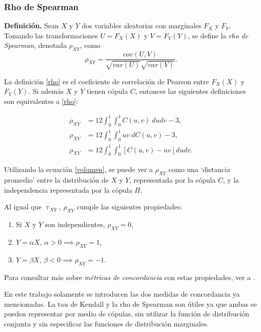 \documentclass[11pt,a4paper]{article}
\begin{document}
\newpage

\subsubsection*{Rho de Spearman}

\textbf{Definición.} Sean $X$ y $Y$ dos variables aleatorias con marginales $F_X$ y $F_Y$. Tomando las transformaciones $U = F_X(X)$ y $V = F_Y(Y)$, se define la \textit{rho de Spearman}, denotada $\rho_{XY}$, como
\begin{equation} \label{rho}
\rho_{XY} = \frac{cov(U, V)}{\sqrt{var(U)}\sqrt{var(V)}}.
\end{equation}

La definición \eqref{rho} es el coeficiente de correlación de Pearson entre $F_X(X)$ y $F_Y(Y)$. Si además $X$ y $Y$ tienen cópula $C$, entonces las siguientes definiciones son equivalentes a \eqref{rho}:

\begin{align}
\rho_{XY} &= 12\int_0^1 \int_0^1 C(u, v) \ dudv-3,\nonumber \\
\rho_{XY} &= 12\int_0^1 \int_0^1 uv \ dC(u,v)-3, \nonumber \\
\rho_{XY} &= 12\int_0^1\int_0^1 \left[ C(u, v) - uv \right] dudv \label{volumen}.
\end{align}

Utilizando la ecuación \eqref{volumen}, se puede ver a $\rho_{XY}$ como una `distancia promedio' entre la distribución de $X$ y $Y$, representada por la cópula $C$, y la independencia representada por la cópula $\Pi$.

Al igual que $\uptau_{XY}$, $\rho_{XY}$ cumple las siguientes propiedades:

\begin{enumerate}
\item Si $X$ y $Y$ son independientes, $\rho_{XY} = 0$,
\item $Y = \alpha X$, $\alpha > 0 \implies \rho_{XY} = 1$,
\item $Y = \beta X$, $\beta < 0 \implies \rho_{XY} = -1$.
\end{enumerate}

Para consultar más sobre \textit{métricas de concordancia} con estas propiedades, ver a \citet{nelsen}.

En este trabajo solamente se introducen las dos medidas de concordancia ya mencionadas. La tau de Kendall y la rho de Spearman son útiles ya que ambas se pueden representar por medio de cópulas, sin utilizar la función de distribución conjunta y sin especificar las funciones de distribución marginales.
\end{document}
